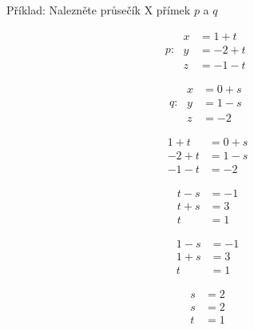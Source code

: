 \documentclass[12pt, a4paper]{scrartcl}
\begin{document}
    Příklad: Nalezněte průsečík X přímek $p$ a $q$
    \begin{multicols}{2}
        \begin{equation*}
            p:\;\begin{aligned}
            x &= 1 + t \\
            y &= -2 + t \\
            z &= -1 - t
            \end{aligned}
        \end{equation*}

        \begin{equation*}
            q:\;\begin{aligned}
            x &= 0 + s \\
            y &= 1 - s \\
            z &= -2
            \end{aligned}
        \end{equation*}
    \end{multicols}

    \begin{multicols}{4}
        \begin{equation*}
            \begin{aligned}
                1 + t &= 0 + s \\
                -2 + t &= 1 - s \\
                -1 - t &= -2
            \end{aligned}
        \end{equation*}

        \begin{equation*}
            \begin{aligned}
                t - s &= -1 \\
                t + s &= 3 \\
                t &= 1
            \end{aligned}
        \end{equation*}

        \begin{equation*}
            \begin{aligned}
                1 - s &= -1 \\
                1 + s &= 3 \\
                t &=1
            \end{aligned}
        \end{equation*}

        \begin{equation*}
            \begin{aligned}
                s &= 2 \\
                s &= 2 \\
                t &= 1
            \end{aligned}
        \end{equation*}
    \end{multicols}
\end{document}
